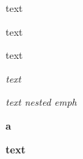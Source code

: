 \documentclass[12pt]{article}
\newcommand\"{quote}
\begin{document}





\inputminted{py}{path/to/file.py}



\textnormal{text}

\textrm{text}

\textsf{text}

\emph{text}

\emph{text \emph{nested} emph}

\textbf{a}

\textbf{text}
\end{document}
